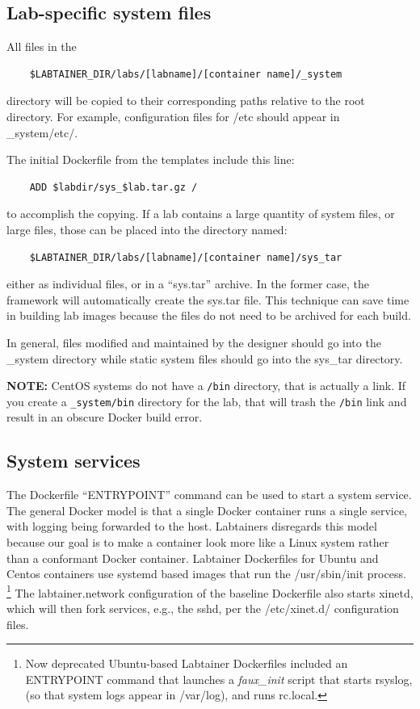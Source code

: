 \documentclass[12pt]{article}
\begin{document}
\subsection{Lab-specific system files}
All files in the
\begin{verbatim}
    $LABTAINER_DIR/labs/[labname]/[container name]/_system
\end{verbatim}
\noindent directory will be copied to their corresponding paths relative to the root directory.
For example, configuration files for /etc should appear in \_system/etc/.

The initial Dockerfile from the templates include this line:
\begin{verbatim}
    ADD $labdir/sys_$lab.tar.gz /
\end{verbatim}
\noindent to accomplish the copying. 
If a lab contains a large quantity of system files, or large files, those
can be placed into the directory named:
\begin{verbatim}
    $LABTAINER_DIR/labs/[labname]/[container name]/sys_tar
\end{verbatim}
either as individual files, or in a ``sys.tar'' archive.  In the former case,
the framework will automatically create the sys.tar file.  This technique 
can save time in building lab images because the files do not need to be 
archived for each build.  

In general, files modified and maintained by the designer should go into the
\_system directory while static system files should go into the sys\_tar directory.

\textbf{NOTE:} CentOS systems do not have a {\tt /bin} directory, that is actually a link.  If you
create a {\tt \_system/bin} directory for the lab, that will trash the {\tt /bin} link and result in 
an obscure Docker build error.

\subsection {System services}
The Dockerfile ``ENTRYPOINT'' command can be used to start a system service.  The general Docker 
model is that a single Docker container runs a single service, with logging being forwarded to 
the host.  Labtainers disregards this model because our goal is to make a container look more like a Linux
system rather than a conformant Docker container.  Labtainer Dockerfiles for Ubuntu and Centos containers
use systemd based images that run the /usr/sbin/init process.  \footnote {Now deprecated Ubuntu-based Labtainer Dockerfiles included an
ENTRYPOINT command that launches a \textit{faux\_init} script that starts rsyslog, (so that system logs
appear in /var/log), and runs rc.local.}  The labtainer.network configuration of the baseline Dockerfile also starts xinetd,
which will then fork services, e.g., the sshd, per the /etc/xinet.d/ configuration files.  
\end{document}
